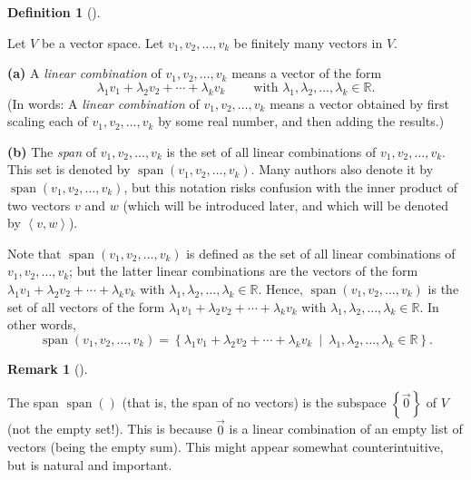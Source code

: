 \documentclass[numbers=enddot,12pt,final,onecolumn,notitlepage]{scrartcl}%
\theoremstyle{definition}
\newtheorem{defi}[theo]{Definition}
\newenvironment{definition}[1][]
{\begin{defi}[#1]\begin{leftbar}}
{\end{leftbar}\end{defi}}
\newtheorem{remk}[theo]{Remark}
\newenvironment{remark}[1][]
{\begin{remk}[#1]\begin{leftbar}}
{\end{leftbar}\end{remk}}
\begin{document}
\begin{definition}
\label{def.subspace.span}Let $V$ be a vector space. Let $v_{1},v_{2}%
,\ldots,v_{k}$ be finitely many vectors in $V$.

\textbf{(a)} A \textit{linear combination} of $v_{1},v_{2},\ldots,v_{k}$ means
a vector of the form%
\[
\lambda_{1}v_{1}+\lambda_{2}v_{2}+\cdots+\lambda_{k}v_{k}%
\ \ \ \ \ \ \ \ \ \ \text{with }\lambda_{1},\lambda_{2},\ldots,\lambda_{k}%
\in\mathbb{R}.
\]
(In words: A \textit{linear combination} of $v_{1},v_{2},\ldots,v_{k}$ means a
vector obtained by first scaling each of $v_{1},v_{2},\ldots,v_{k}$ by some
real number, and then adding the results.)

\textbf{(b)} The \textit{span} of $v_{1},v_{2},\ldots,v_{k}$ is the set of all
linear combinations of $v_{1},v_{2},\ldots,v_{k}$. This set is denoted by
$\operatorname*{span}\left(  v_{1},v_{2},\ldots,v_{k}\right)  $. Many authors
also denote it by $\operatorname{span}\left(  v_{1},v_{2},\ldots,v_{k}\right)
$, but this notation risks confusion with the inner product of two vectors $v$
and $w$ (which will be introduced later, and which will be denoted by $\left<
v,w\right>  $).

Note that $\operatorname{span}\left(  v_{1},v_{2},\ldots,v_{k}\right)  $ is
defined as the set of all linear combinations of $v_{1},v_{2},\ldots,v_{k}$;
but the latter linear combinations are the vectors of the form $\lambda
_{1}v_{1}+\lambda_{2}v_{2}+\cdots+\lambda_{k}v_{k}$ with $\lambda_{1}%
,\lambda_{2},\ldots,\lambda_{k}\in\mathbb{R}$. Hence, $\operatorname{span}%
\left(  v_{1},v_{2},\ldots,v_{k}\right)  $ is the set of all vectors of the
form $\lambda_{1}v_{1}+\lambda_{2}v_{2}+\cdots+\lambda_{k}v_{k}$ with
$\lambda_{1},\lambda_{2},\ldots,\lambda_{k}\in\mathbb{R}$. In other words,%
\begin{equation}
\operatorname{span}\left(  v_{1},v_{2},\ldots,v_{k}\right)  =\left\{
\lambda_{1}v_{1}+\lambda_{2}v_{2}+\cdots+\lambda_{k}v_{k}\ \mid\ \lambda
_{1},\lambda_{2},\ldots,\lambda_{k}\in\mathbb{R}\right\}  .
\label{eq.def.subspace.span.explicit}%
\end{equation}

\end{definition}

\begin{remark}
The span $\operatorname{span}\left(  {}\right)  $ (that is, the span of no
vectors) is the subspace $\left\{  \overrightarrow{0}\right\}  $ of $V$ (not
the empty set!). This is because $\overrightarrow{0}$ is a linear combination
of an empty list of vectors (being the empty sum). This might appear somewhat
counterintuitive, but is natural and important.
\end{remark}
\end{document}
